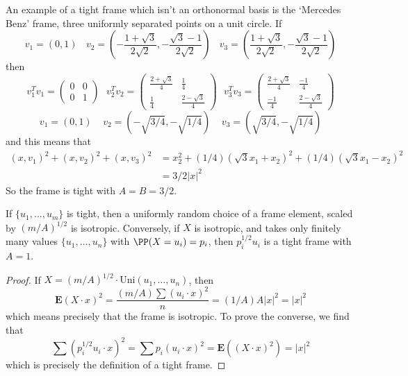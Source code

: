 \begin{example}
    An example of a tight frame which isn't an orthonormal basis is the `Mercedes Benz' frame, three uniformly separated points on a unit circle. If
    \[ v_1 = (0,1)\ \ \ \ v_2 = \left(-\frac{1 + \sqrt{3}}{2\sqrt{2}}, -\frac{\sqrt{3} - 1}{2\sqrt{2}} \right)\ \ \ \ v_3 = \left(\frac{1 + \sqrt{3}}{2\sqrt{2}}, -\frac{\sqrt{3} - 1}{2\sqrt{2}} \right) \]
    then
    \[ v_1^T v_1 = \begin{pmatrix} 0 & 0 \\ 0 & 1 \end{pmatrix}\ \ \ v_2^T v_2 = \begin{pmatrix} \frac{2 + \sqrt{3}}{4} & \frac{1}{4} \\ \frac{1}{4} & \frac{2 - \sqrt{3}}{4} \end{pmatrix}\ \ \ v_3^T v_3 = \begin{pmatrix} \frac{2 + \sqrt{3}}{4} & \frac{-1}{4} \\ \frac{-1}{4} & \frac{2 - \sqrt{3}}{4} \end{pmatrix} \]
    \[ v_1 = (0,1)\ \ \ \ \ v_2 = (-\sqrt{3/4},-\sqrt{1/4})\ \ \ \ \ v_3 = (\sqrt{3/4},-\sqrt{1/4}) \]
    and this means that
    \begin{align*}
        (x,v_1)^2 + (x,v_2)^2 + (x,v_3)^2 &= x_2^2 + (1/4) (\sqrt{3} x_1 + x_2)^2 + (1/4) ( \sqrt{3} x_1 - x_2)^2\\
        &= 3/2 |x|^2
    \end{align*}
    So the frame is tight with $A = B = 3/2$.
\end{example}

\begin{theorem}
    If $\{ u_1, \dots, u_m \}$ is tight, then a uniformly random choice of a frame element, scaled by $(m/A)^{1/2}$ is isotropic. Conversely, if $X$ is isotropic, and takes only finitely many values $\{ u_1, \dots, u_n \}$ with $\PP(X = u_i) = p_i$, then $p_i^{1/2} u_i$ is a tight frame with $A = 1$.
\end{theorem}
\begin{proof}
    If $X = (m/A)^{1/2} \cdot \text{Uni}(u_1, \dots, u_n)$, then
    \[ \mathbf{E} (X \cdot x)^2 = \frac{(m/A) \sum (u_i \cdot x)^2}{n} = (1/A) A|x|^2 = |x|^2 \]
    which means precisely that the frame is isotropic. To prove the converse, we find that
    \[ \sum (p_i^{1/2} u_i \cdot x)^2 = \sum p_i (u_i \cdot x)^2 = \mathbf{E}((X \cdot x)^2) = |x|^2 \]
    which is precisely the definition of a tight frame.
\end{proof}

